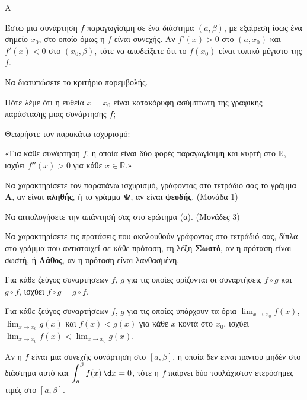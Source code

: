 \begin{thema}{Α}
\begin{erwthma}
    \item Έστω μια συνάρτηση $f$ παραγωγίσιμη σε ένα διάστημα $(a, \beta)$, με εξαίρεση ίσως ένα σημείο $x_0$, στο οποίο όμως η $f$ είναι συνεχής. Αν $f'(x) > 0$ στο $(a, x_0)$ και $f'(x) < 0$ στο $(x_0, \beta)$, τότε να αποδείξετε ότι το $f(x_0)$ είναι τοπικό μέγιστο της $f$. 

    \item Να διατυπώσετε το κριτήριο παρεμβολής. 

    \item Πότε λέμε ότι η ευθεία $x = x_0$ είναι κατακόρυφη ασύμπτωτη της γραφικής παράστασης μιας συνάρτησης $f$; 

    \item Θεωρήστε τον παρακάτω ισχυρισμό:

    «Για κάθε συνάρτηση $f$, η οποία είναι δύο φορές παραγωγίσιμη και κυρτή στο $\mathbb{R}$, ισχύει $f''(x) > 0$ για κάθε $x \in \mathbb{R}$.»
    \begin{alist}
        \item[α.] Να χαρακτηρίσετε τον παραπάνω ισχυρισμό, γράφοντας στο τετράδιό σας το γράμμα \textbf{Α}, αν είναι \textbf{αληθής}, ή το γράμμα \textbf{Ψ}, αν είναι \textbf{ψευδής}. \hfill(Μονάδα 1)
        \item[β.] Να αιτιολογήσετε την απάντησή σας στο ερώτημα (α). \hfill(Μονάδες 3)
    \end{alist}

    \item Να χαρακτηρίσετε τις προτάσεις που ακολουθούν γράφοντας στο τετράδιό σας, δίπλα στο γράμμα που αντιστοιχεί σε κάθε πρόταση, τη λέξη \textbf{Σωστό}, αν η πρόταση είναι σωστή, ή \textbf{Λάθος}, αν η πρόταση είναι λανθασμένη.
    \begin{alist}
        \item Για κάθε ζεύγος συναρτήσεων $f$, $g$ για τις οποίες ορίζονται οι συναρτήσεις $f \circ g$ και $g \circ f$, ισχύει $f \circ g = g \circ f$.
        \item Για κάθε ζεύγος συναρτήσεων $f$, $g$ για τις οποίες υπάρχουν τα όρια $\displaystyle\lim_{x \to x_0} f(x)$, $\displaystyle\lim_{x \to x_0} g(x)$ και $f(x) < g(x)$ για κάθε $x$ κοντά στο $x_0$, ισχύει $\displaystyle\lim_{x \to x_0} f(x) < \lim_{x \to x_0} g(x)$.
        \item Αν η $f$ είναι μια συνεχής συνάρτηση στο $[a, \beta]$, η οποία δεν είναι παντού μηδέν στο διάστημα αυτό και $\displaystyle\int_a^\beta f(x)\,\d x = 0$, τότε η $f$ παίρνει δύο τουλάχιστον ετερόσημες τιμές στο $[a, \beta]$.
    \end{alist}
\end{erwthma}
\end{thema}

